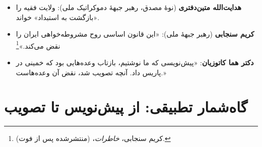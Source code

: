 \documentclass[12pt,a4paper]{book}
\begin{document}
\begin{itemize}[label=\textcolor{cAccent}{$\blacktriangleright$}, rightmargin=2em]
    \item \textbf{هدایت‌الله متین‌دفتری} (نوهٔ مصدق، رهبر جبههٔ دموکراتیک ملی): ولایت فقیه را «بازگشت به استبداد» خواند.
    \item \textbf{کریم سنجابی} (رهبر جبههٔ ملی): «این قانون اساسی روح مشروطه‌خواهی ایران را نقض می‌کند.»\footnote{کریم سنجابی، \textit{خاطرات}، (منتشرشده پس از فوت).}
    \item \textbf{دکتر هما کاتوزیان}: «پیش‌نویسی که ما نوشتیم، بازتاب وعده‌هایی بود که خمینی در پاریس داد. آنچه تصویب شد، نقض آن وعده‌هاست.»
\end{itemize}

\section{گاه‌شمار تطبیقی: از پیش‌نویس تا تصویب}
\end{document}
